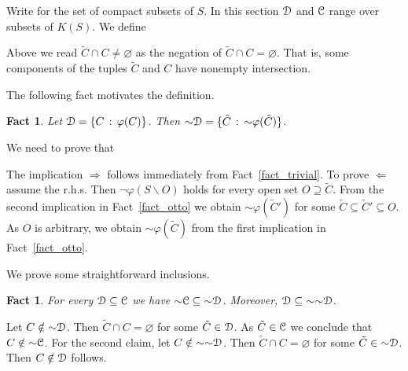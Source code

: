 \documentclass{amsproc}
\makeatletter
\newcounter{thm}
\theoremstyle{mio}
\newtheorem{fact}[thm]{Fact}\tcolorboxenvironment{fact}{mythm}
\providecommand{\proofNameStyle}{\bfseries}
\renewenvironment{proof}[1][\proofname]{\par
  \pushQED{\qed}%
  \normalfont%
  \trivlist
  \item[\hskip\labelsep
        \proofNameStyle
    #1\@addpunct{.}]\ignorespaces
}{%
  \popQED\endtrivlist\@endpefalse
}
\renewcommand*{\emph}[1]{%
   \smash{\tikz[baseline]\node[rectangle, fill=teal!25, rounded corners, inner xsep=0.5ex, inner ysep=0.2ex, anchor=base, minimum height = 2.7ex]{\strut #1};}}
\makeatother
\begin{document}
Write \emph{$K(S)$\/} for the set of compact subsets of $S$.
In this section ${\EuScript D}$ and ${\EuScript C}$ range over subsets of $K(S)$.
We define 

\ceq{\hfill\emph{${\sim}{\EuScript D}$}}{=}{\big\{\tilde C\ :\ \tilde C\cap C\neq\varnothing\text{ for every }C\in{\EuScript D}\big\}.}

Above we read $\tilde C\cap C\neq\varnothing$ as the negation of $\tilde C\cap C=\varnothing$.
That is, some components of the tuples $\tilde C$ and $C$ have nonempty intersection.

The following fact motivates the definition.

\begin{fact}\label{fact_~definibile}
  Let ${\EuScript D}=\{C\,:\,\varphi(C)\}$.
  Then ${\sim}{\EuScript D}=\{\tilde C\,:\,{\sim}\varphi(\tilde C)\}$.
\end{fact}

\begin{proof}
  We need to prove that 


  The implication $\Rightarrow$ follows immediately from Fact~\ref{fact_trivial}.
  To prove $\Leftarrow$ assume the r.h.s.
  Then $\neg\varphi(S\smallsetminus O)$ holds for every open set  $O\supseteq\tilde C$.
  From the second implication in Fact~\ref{fact_otto} we obtain ${\sim}\varphi(\tilde C')$ for some $\tilde C\subseteq\tilde C'\subseteq O$.
As $O$ is arbitrary, we obtain ${\sim}\varphi(\tilde C)$ from the first implication in Fact~\ref{fact_otto}.
\end{proof}

We prove some straightforward inclusions.

\begin{fact}\label{fact_~inclusione}
  For every ${\EuScript D}\subseteq{\EuScript C}$ we have ${\sim}{\EuScript C}\subseteq{\sim}{\EuScript D}$.  
  Moreover, ${\EuScript D}\subseteq{\sim}{\sim}{\EuScript D}$.
\end{fact}

\begin{proof}
  Let $C\notin{\sim}{\EuScript D}$.
  Then $\tilde C\cap C=\varnothing$ for some $\tilde C\in{\EuScript D}$.
  As  $\tilde C\in{\EuScript C}$ we conclude that  $C\notin{\sim}{\EuScript C}$.
  For the second claim, let $C\notin{\sim}{\sim}{\EuScript D}$.
  Then $\tilde C\cap C=\varnothing$ for some $\tilde C\in{\sim}{\EuScript D}$.
  Then $C\notin{\EuScript D}$ follows.
\end{proof}
\end{document}
